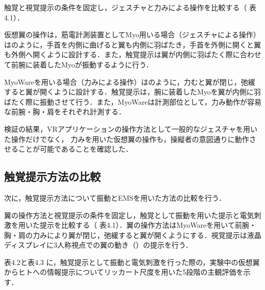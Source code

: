 \begin{small}
      触覚と視覚提示の条件を固定し，ジェスチャと力みによる操作を比較する（
      表4.1）．

      仮想翼の操作は，筋電計測装置としてMyo用いる場合（ジェスチャによる操作）はのように，手首を内側に曲げると翼も内側に羽ばたき，手首を外側に開くと翼も外側へ開くように設計する．また，触覚提示は翼が内側に羽ばたく際に合わせて前腕に装着したMyoが振動するように行う．
      
      MyoWareを用いる場合（力みによる操作）はのように，力むと翼が閉じ，弛緩すると翼が開くように設計する．触覚提示は，腕に装着したMyoを翼が内側に羽ばたく際に振動させて行う．また，MyoWareは計測部位として，力み動作が容易な前腕・胸・肩をそれぞれ計測する．

      検証の結果，VRアプリケーションの操作方法として一般的なジェスチャを用いた操作だけでなく，
      力みを用いた仮想翼の操作も，操縦者の意図通りに動作させることが可能であることを確認した．

    \subsection{触覚提示方法の比較} %
      次に，触覚提示方法について振動とEMSを用いた方法の比較を行う．
    
      翼の操作方法と視覚提示の条件を固定し，触覚として振動を用いた提示と電気刺激を用いた提示を比較する（
      表4.1）．翼の操作方法はMyoWareを用いて前腕・胸・肩の力みにより翼が閉じ，弛緩すると翼が開くようにする．視覚提示は液晶ディスプレイに3人称視点での翼の動き（）の提示を行う．

      表4.2と表4.3
      に，触覚提示として振動と電気刺激を行った際の，実験中の仮想翼からヒトへの情報提示についてリッカート尺度を用いた5段階の主観評価を示す．
      

\end{small}
